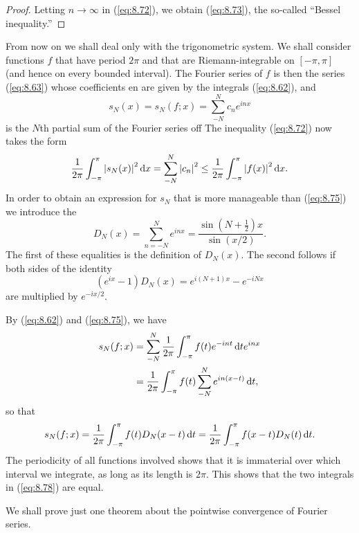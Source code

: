\begin{proof}
    Letting $n \rightarrow \infty $ in (\ref{eq:8.72}), we obtain (\ref{eq:8.73}), the so-called ``Bessel inequality.''
\end{proof}


\begin{thm}
    \label{thm:8.13}
    From now on we shall deal only with the trigonometric system. 
    We shall consider functions $f$ that have period $2\pi$ and that are Riemann-integrable on $[-\pi, \pi]$ (and hence on every bounded interval). 
    The Fourier series of $f$ is then the series (\ref{eq:8.63}) whose coefficients en are given by the integrals (\ref{eq:8.62}), and
    \begin{equation}
        \label{eq:8.75}
        s_N(x)=s_N(f;x)=\sum_{-N}^{N}c_n e^{inx}
    \end{equation}
    is the $N$th partial sum of the Fourier series off The inequality (\ref{eq:8.72}) now takes the form
    \begin{equation}
        \label{eq:8.76}
        \frac{1}{2\pi} \int_{-\pi}^{\pi} \left| s_N(x) \right|^2 \d x = 
        \sum_{-N}^{N} \left| c_n \right|^2 \leq
        \frac{1}{2\pi} \int_{-\pi}^{\pi} \left| f(x) \right|^2 \d x.
    \end{equation}
    In order to obtain an expression for $s_N$ that is more manageable than (\ref{eq:8.75})
    we introduce the 
    \begin{equation}
        \label{eq:8.77}
        D_N(x) = \sum_{n=-N}^{N} e^{inx} = \frac{\sin(N+\frac{1}{2})x}{\sin(x/2)} .
    \end{equation}
    The first of these equalities is the definition of $D_N(x)$. 
    The second follows if both sides of the identity
    \begin{equation*}
        (e^{ix}-1)D_N(x) = e^{i(N+1)x} - e^{-iNx}
    \end{equation*}
    are multiplied by $e^{-ix/2}$.

    By (\ref{eq:8.62}) and (\ref{eq:8.75}), we have 
    \begin{align*}
        s_N(f;x) 
        &= \sum_{-N}^{N} \frac{1}{2\pi} \int_{-\pi}^{\pi} f(t) e^{-int} \d t e^{inx} \\
        &= \frac{1}{2\pi} \int_{-\pi}^{\pi} f(t) \sum_{-N}^{N} e^{in(x-t)} \d t ,
    \end{align*}
    so that 
    \begin{equation}
        \label{eq:8.78}
        s_N(f;x)=\frac{1}{2\pi}\int_{-\pi}^{\pi}f(t)D_N(x-t)\d t 
        =\frac{1}{2\pi} \int_{-\pi}^{\pi} f(x-t) D_N(t) \d t.
    \end{equation}
    The periodicity of all functions involved shows that it is immaterial over which interval we integrate, as long as its length is $2\pi$. 
    This shows that the two integrals in (\ref{eq:8.78}) are equal. 
    
    We shall prove just one theorem about the pointwise convergence of Fourier series.
\end{thm}


